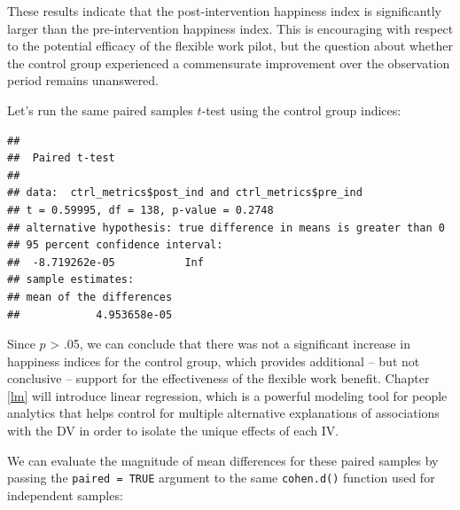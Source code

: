 \documentclass[]{book}
\newenvironment{Shaded}{\begin{snugshade}}{\end{snugshade}}
\newcommand{\CommentTok}[1]{\textcolor[rgb]{0.56,0.35,0.01}{\textit{#1}}}
\newcommand{\DataTypeTok}[1]{\textcolor[rgb]{0.13,0.29,0.53}{#1}}
\newcommand{\KeywordTok}[1]{\textcolor[rgb]{0.13,0.29,0.53}{\textbf{#1}}}
\newcommand{\NormalTok}[1]{#1}
\newcommand{\OperatorTok}[1]{\textcolor[rgb]{0.81,0.36,0.00}{\textbf{#1}}}
\newcommand{\OtherTok}[1]{\textcolor[rgb]{0.56,0.35,0.01}{#1}}
\newcommand{\StringTok}[1]{\textcolor[rgb]{0.31,0.60,0.02}{#1}}
\begin{document}
These results indicate that the post-intervention happiness index is significantly larger than the pre-intervention happiness index. This is encouraging with respect to the potential efficacy of the flexible work pilot, but the question about whether the control group experienced a commensurate improvement over the observation period remains unanswered.

Let's run the same paired samples \(t\)-test using the control group indices:

\begin{Shaded}
\end{Shaded}

\begin{verbatim}
## 
##  Paired t-test
## 
## data:  ctrl_metrics$post_ind and ctrl_metrics$pre_ind
## t = 0.59995, df = 138, p-value = 0.2748
## alternative hypothesis: true difference in means is greater than 0
## 95 percent confidence interval:
##  -8.719262e-05           Inf
## sample estimates:
## mean of the differences 
##            4.953658e-05
\end{verbatim}

Since \(p\) \textgreater{} .05, we can conclude that there was not a significant increase in happiness indices for the control group, which provides additional -- but not conclusive -- support for the effectiveness of the flexible work benefit. Chapter \ref{lm} will introduce linear regression, which is a powerful modeling tool for people analytics that helps control for multiple alternative explanations of associations with the DV in order to isolate the unique effects of each IV.

We can evaluate the magnitude of mean differences for these paired samples by passing the \texttt{paired\ =\ TRUE} argument to the same \texttt{cohen.d()} function used for independent samples:

\begin{Shaded}
\end{Shaded}
\end{document}
